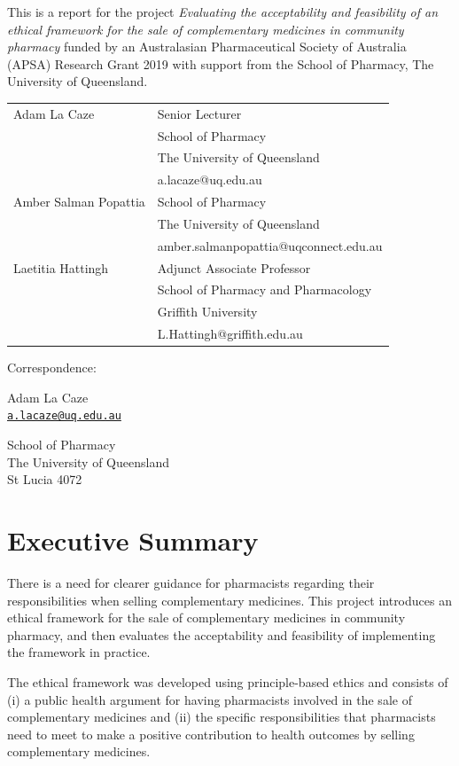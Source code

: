 \documentclass[12pt,]{article}
\author{}
\date{\vspace{-2.5em}}
\begin{document}


This is a report for the project \emph{Evaluating the acceptability and
feasibility of an ethical framework for the sale of complementary
medicines in community pharmacy} funded by an Australasian
Pharmaceutical Society of Australia (APSA) Research Grant 2019 with
support from the School of Pharmacy, The University of Queensland.

\bigskip

\bigskip

\begin{tabular}{ll} Adam La Caze & Senior Lecturer\tabularnewline
& School of Pharmacy\tabularnewline
& The University of Queensland\tabularnewline
& a.lacaze@uq.edu.au\tabularnewline[10pt] Amber Salman Popattia & School of Pharmacy\tabularnewline
& The University of Queensland\tabularnewline
& amber.salmanpopattia@uqconnect.edu.au\tabularnewline[10pt] Laetitia Hattingh & Adjunct Associate Professor\tabularnewline
& School of Pharmacy and Pharmacology\tabularnewline
& Griffith University\tabularnewline
& L.Hattingh@griffith.edu.au\tabularnewline
\end{tabular}

\bigskip

Correspondence:

Adam La Caze\\
\href{mailto:a.lacaze@uq.edu.au}{\nolinkurl{a.lacaze@uq.edu.au}}

School of Pharmacy\\
The University of Queensland\\
St Lucia 4072

\newpage

\section*{Executive Summary}\label{executive-summary}

There is a need for clearer guidance for pharmacists regarding their
responsibilities when selling complementary medicines. This project
introduces an ethical framework for the sale of complementary medicines
in community pharmacy, and then evaluates the acceptability and
feasibility of implementing the framework in practice.

The ethical framework was developed using principle-based ethics and
consists of (i) a public health argument for having pharmacists involved
in the sale of complementary medicines and (ii) the specific
responsibilities that pharmacists need to meet to make a positive
contribution to health outcomes by selling complementary medicines.
\end{document}
